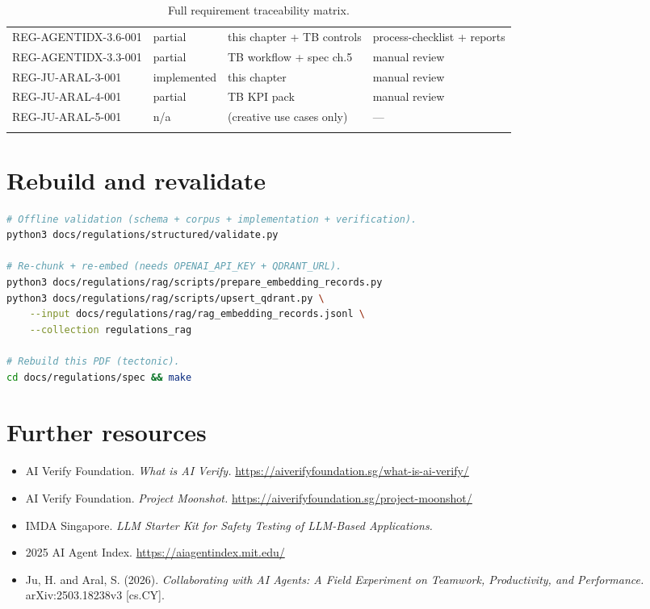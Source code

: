 \begin{longtable}{p{3.5cm}p{1.6cm}p{4.6cm}p{3.6cm}}
REG-AGENTIDX-3.6-001 & partial    & this chapter + TB controls                  & process-checklist + reports \\
REG-AGENTIDX-3.3-001 & partial    & TB workflow + spec ch.5                     & manual review \\
REG-JU-ARAL-3-001 & implemented   & this chapter                                & manual review \\
REG-JU-ARAL-4-001 & partial       & TB KPI pack                                 & manual review \\
REG-JU-ARAL-5-001 & n/a           & (creative use cases only)                   & --- \\
\bottomrule
\caption{Full requirement traceability matrix.}
\label{tab:trace}
\end{longtable}

\section{Rebuild and revalidate}

\begin{lstlisting}[language=bash,caption={Commands to re-run validation
and rebuild the PDF.}]
# Offline validation (schema + corpus + implementation + verification).
python3 docs/regulations/structured/validate.py

# Re-chunk + re-embed (needs OPENAI_API_KEY + QDRANT_URL).
python3 docs/regulations/rag/scripts/prepare_embedding_records.py
python3 docs/regulations/rag/scripts/upsert_qdrant.py \
    --input docs/regulations/rag/rag_embedding_records.jsonl \
    --collection regulations_rag

# Rebuild this PDF (tectonic).
cd docs/regulations/spec && make
\end{lstlisting}

\section{Further resources}

\begin{itemize}
  \item AI Verify Foundation. \emph{What is AI Verify.}
        \url{https://aiverifyfoundation.sg/what-is-ai-verify/}
  \item AI Verify Foundation. \emph{Project Moonshot.}
        \url{https://aiverifyfoundation.sg/project-moonshot/}
  \item IMDA Singapore. \emph{LLM Starter Kit for Safety Testing of
        LLM-Based Applications.}
  \item 2025 AI Agent Index. \url{https://aiagentindex.mit.edu/}
  \item Ju, H. and Aral, S. (2026). \emph{Collaborating with AI Agents:
        A Field Experiment on Teamwork, Productivity, and Performance.}
        arXiv:2503.18238v3 [cs.CY].
\end{itemize}
